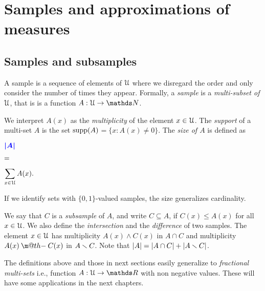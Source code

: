 \documentclass[sputnik.tex]{subfiles}
\begin{document}
\def\Fr{\mathop{\rm Fr}}

\def\vc{{\footnotesize VC}}
\def\nip{{\footnotesize NIP}}


\def\medrel#1{\parbox[t]{6ex}{$\displaystyle\hfil #1$}}
\def\ceq#1#2#3{\parbox[t]{25ex}{$\displaystyle #1$}\medrel{#2}{$\displaystyle #3$}}



\chapter{Samples and approximations of measures}


\section{Samples and subsamples}\label{multisets}

\def\ceq#1#2#3{\parbox[t]{32ex}{$\displaystyle #1$}\parbox{5ex}{$\displaystyle\hfil #2$}{$\displaystyle #3$}}

A sample is a sequence of elements of $\EuScript U$ where we disregard the order and only consider the number of times they appear.
Formally, a \emph{sample\/} is a \emph{multi-subset of $\EuScript U$}, that is is a function $A:\U\to\NN$. 

We interpret $A(x)$ as the \emph{multiplicity\/} of the element $x\in\EuScript U$.
The \emph{support\/} of a multi-set $A$ is the set \emph{$\mathop{\rm supp}(A)$}$=\{x:A(x)\neq0\}$.
The \emph{size of $A$\/} is defined as

\ceq{\hfill\emph{$|A|$}}{=}{\sum_{x\in\U} A(x).}

If we identify sets with $\{0,1\}$-valued samples, the size generalizes cardinality. 

\makeatletter
\def\dotminus{\mathbin{\ooalign{\hidewidth\raise1ex\hbox{.}\hidewidth\cr$\m@th-$\cr}}}
\makeatother

We say that $C$ is a \emph{subsample\/} of $A$, and write \emph{$C\subseteq A$}, if $C(x)\le A(x)$ for all $x\in\EuScript U$.
We also define the \emph{intersection\/} and the \emph{difference\/} of two samples.
The element $x\in\EuScript U$ has multiplicity  $A(x)\wedge C(x)$ in \emph{$A\cap C$\/} and multiplicity  $A(x)\dotminus C(x)$ in \emph{$A\smallsetminus C$}.
Note that $|A|=|A\cap C|+|A\smallsetminus C|$.


The definitions above and those in next sections easily generalize to \emph{fractional multi-sets\/} i.e., function $A:\U\to\RR$ with non negative values.
These will have some applications in the next chapters.
\end{document}
